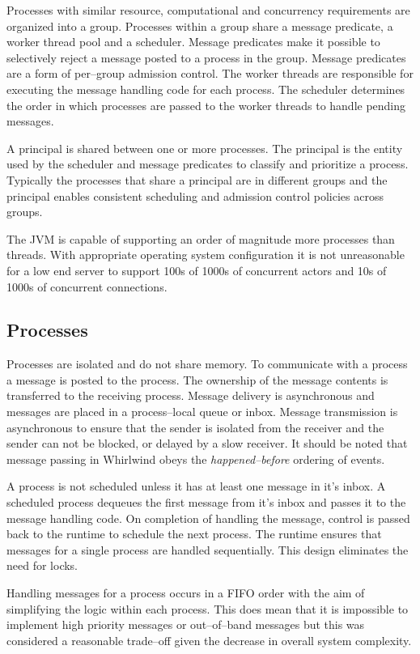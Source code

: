 \documentclass[conference,a4paper,final]{IEEEtran}
\begin{document}
Processes with similar resource, computational and concurrency requirements are organized into a group. Processes within a group share a message predicate, a worker thread pool and a scheduler. Message predicates make it possible to selectively reject a message posted to a process in the group. Message predicates are a form of per--group admission control. The worker threads are responsible for executing the message handling code for each process. The scheduler determines the order in which processes are passed to the worker threads to handle pending messages.

A principal is shared between one or more processes. The principal is the entity used by the scheduler and message predicates to classify and prioritize a process. Typically the processes that share a principal are in different groups and the principal enables consistent scheduling and admission control policies across groups.

The JVM is capable of supporting an order of magnitude more processes than threads. With appropriate operating system configuration it is not unreasonable for a low end server to support 100s of 1000s of concurrent actors and 10s of 1000s of concurrent connections.

\subsection{Processes}
\label{section:Processes}

Processes are isolated and do not share memory. To communicate with a process a message is posted to the process. The ownership of the message contents is transferred to the receiving process. Message delivery is asynchronous and messages are placed in a process--local queue or inbox. Message transmission is asynchronous to ensure that the sender is isolated from the receiver and the sender can not be blocked, or delayed by a slow receiver. It should be noted that message passing in Whirlwind obeys the \emph{happened--before} ordering of events.

A process is not scheduled unless it has at least one message in it's inbox. A scheduled process dequeues the first message from it's inbox and passes it to the message handling code. On completion of handling the message, control is passed back to the runtime to schedule the next process. The runtime ensures that messages for a single process are handled sequentially. This design eliminates the need for locks.

Handling messages for a process occurs in a FIFO order with the aim of simplifying the logic within each process. This does mean that it is impossible to implement high priority messages or out--of--band messages but this was considered a reasonable trade--off given the decrease in overall system complexity.
\end{document}
